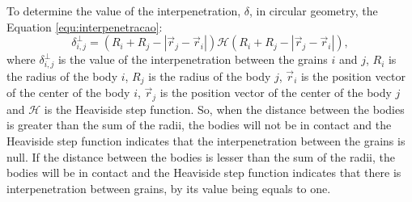     To determine the value of the interpenetration, $\delta$, in circular geometry, the Equation \ref{equ:interpenetracao}:
\begin{equation}
    \label{equ:interpenetracao}
    \delta_{i,j}^{\perp} = \left(R_{i}+R_{j}-\left|\vec{r}_{j}-\vec{r}_{i}\right|\right)\mathcal{H}(R_{i}+R_{j}-\left|\vec{r}_{j}-\vec{r}_{i}\right|),
\end{equation}
where $\delta_{i,j}^{\perp}$ is the value of the interpenetration between the grains $i$ and $j$, $R_{i}$ is the radius of the body $i$, $R_{j}$ is the radius of the body $j$, $\vec{r}_{i}$ is the position vector of the center of the body $i$, $\vec{r}_{j}$ is the position vector of the center of the body $j$ and $\mathcal{H}$ is the Heaviside step function. So, when the distance between the bodies is greater than the sum of the radii, the bodies will not be in contact and the Heaviside step function indicates that the interpenetration between the grains is null. If the distance between the bodies is lesser than the sum of the radii, the bodies will be in contact and the Heaviside step function indicates that there is interpenetration between grains, by its value being equals to one.

